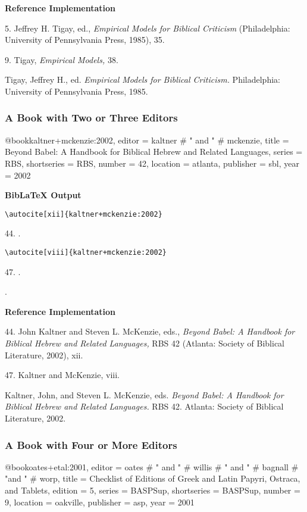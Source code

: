 \documentclass[a4paper]{article}
\newcommand\citetest[5]{%
  {\textbf{BibLaTeX Output}\par
   \nobreak
   \texttt{\textbackslash autocite[#2]\{#5\}}\par
   \color{biblatex-colour}
   #1. \cite[#2]{#5}.\par
   \color{black}
   \texttt{\textbackslash autocite[#4]\{#5\}}\par
   \color{biblatex-colour}
   #3. \cite[#4]{#5}.\par
   \hangindent\bibindent\bibentrycite{#5}.\par}}
\newenvironment{refimp}{%
  \begin{minipage}{\linewidth}
    \setlength{\parskip}{1ex}
    \textbf{Reference Implementation}\par
    \nobreak
    \color{reference-colour}
}{\end{minipage}}
\newenvironment{vb}{%
  \setlength{\parskip}{0pt}
  \verbatim}{\endverbatim}
\begin{document}
\begin{refimp}
  5. Jeffrey H. Tigay, ed., \emph{Empirical Models for Biblical Criticism}
  (Philadelphia: University of Pennsylvania Press, 1985), 35.

  9. Tigay, \emph{Empirical Models,} 38.

  \hangindent\bibindent Tigay, Jeffrey H., ed. \emph{Empirical Models for
  Biblical Criticism.} Philadelphia: University of Pennsylvania Press,
  1985.
\end{refimp}

\subsubsection{A Book with Two or Three Editors}

\begin{vb}
@book{kaltner+mckenzie:2002,
  editor = kaltner # " and " # mckenzie,
  title = {Beyond Babel: A Handbook for Biblical Hebrew and
           Related Languages},
  series = RBS,
  shortseries = {RBS},
  number = {42},
  location = atlanta,
  publisher = sbl,
  year = {2002}
}
\end{vb}  

\citetest{44}{xii}{47}{viii}{kaltner+mckenzie:2002}

\begin{refimp}
  44. John Kaltner and Steven L. McKenzie, eds., \emph{Beyond Babel: A Handbook
  for Biblical Hebrew and Related Languages,} RBS 42 (Atlanta: Society of
  Biblical Literature, 2002), xii.

  47. Kaltner and McKenzie, viii.

  \hangindent\bibindent Kaltner, John, and Steven L. McKenzie, eds.
  \emph{Beyond Babel: A Handbook for Biblical Hebrew and Related Languages.}
  RBS 42. Atlanta: Society of Biblical Literature, 2002.
\end{refimp}

\subsubsection{A Book with Four or More Editors}

\begin{vb}
@book{oates+etal:2001,
  editor = oates # " and " # willis # " and " # bagnall #
           "and " # worp,
  title = {Checklist of Editions of Greek and Latin Papyri,
           Ostraca, and Tablets},
  edition = {5},
  series = BASPSup,
  shortseries = {BASPSup},
  number = {9},
  location = oakville,
  publisher = asp,
  year = {2001}
}
\end{vb}  
\end{document}
